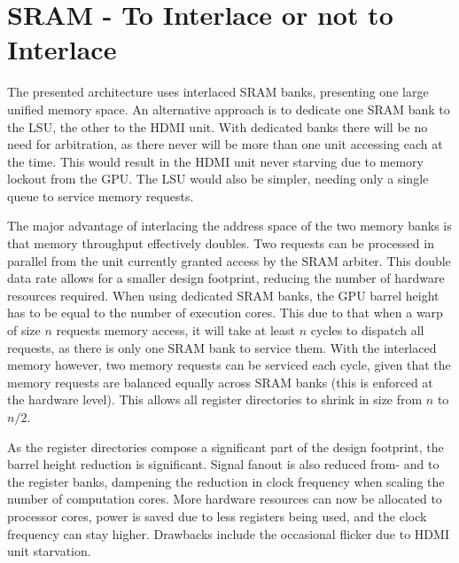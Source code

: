 \section{SRAM - To Interlace or not to Interlace}

The presented architecture uses interlaced SRAM banks, presenting one large unified memory space.
An alternative approach is to dedicate one SRAM bank to the LSU, the other to the HDMI unit.
With dedicated banks there will be no need for arbitration, as there never will be more than one unit accessing each at the time.
This would result in the HDMI unit never starving due to memory lockout from the GPU.
The LSU would also be simpler, needing only a single queue to service memory requests.

The major advantage of interlacing the address space of the two memory banks is that memory throughput effectively doubles.
Two requests can be processed in parallel from the unit currently granted access by the SRAM arbiter.
This double data rate allows for a smaller design footprint, reducing the number of hardware resources required.
When using dedicated SRAM banks, the GPU barrel height has to be equal to the number of execution cores.
This due to that when a warp of size $n$ requests memory access, it will take at least $n$ cycles to dispatch all requests, as there is only one SRAM bank to service them.
With the interlaced memory however, two memory requests can be serviced each cycle, given that the memory requests are balanced equally across SRAM banks (this is enforced at the hardware level).
This allows all register directories to shrink in size from $n$ to $n/2$.

As the register directories compose a significant part of the design footprint, the barrel height reduction is significant.
Signal fanout is also reduced from- and to the register banks, dampening the reduction in clock frequency when scaling the number of computation cores.
More hardware resources can now be allocated to processor cores, power is saved due to less registers being used, and the clock frequency can stay higher.
Drawbacks include the occasional flicker due to HDMI unit starvation.
